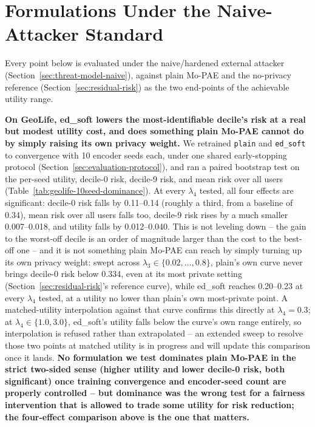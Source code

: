 \section{Formulations Under the Naive-Attacker Standard}
\label{sec:phase4}

Every point below is evaluated under the naive/hardened external
attacker (Section~\ref{sec:threat-model-naive}), against plain Mo-PAE
and the no-privacy reference (Section~\ref{sec:residual-risk}) as the
two end-points of the achievable utility range.

\textbf{On GeoLife, ed\_soft lowers the most-identifiable decile's risk at a real but modest utility cost, and does something plain Mo-PAE cannot do by simply raising its own privacy weight.} We retrained \texttt{plain} and \texttt{ed\_soft} to convergence with 10 encoder seeds each, under one shared early-stopping protocol (Section~\ref{sec:evaluation-protocol}), and ran a paired bootstrap test on the per-seed utility, decile-0 risk, decile-9 risk, and mean risk over all users (Table~\ref{tab:geolife-10seed-dominance}). At every $\lambda_4$ tested, all four effects are significant: decile-0 risk falls by 0.11--0.14 (roughly a third, from a baseline of 0.34), mean risk over all users falls too, decile-9 risk rises by a much smaller 0.007--0.018, and utility falls by 0.012--0.040. This is not leveling down -- the gain to the worst-off decile is an order of magnitude larger than the cost to the best-off one -- and it is not something plain Mo-PAE can reach by simply turning up its own privacy weight: swept across $\lambda_3 \in \{0.02,\ldots,0.8\}$, plain's own curve never brings decile-0 risk below 0.334, even at its most private setting (Section~\ref{sec:residual-risk}'s reference curve), while ed\_soft reaches 0.20--0.23 at every $\lambda_4$ tested, at a utility no lower than plain's own most-private point. A matched-utility interpolation against that curve confirms this directly at $\lambda_4=0.3$; at $\lambda_4\in\{1.0,3.0\}$, ed\_soft's utility falls below the curve's own range entirely, so interpolation is refused rather than extrapolated -- an extended sweep to resolve those two points at matched utility is in progress and will update this comparison once it lands. \textbf{No formulation we test dominates plain Mo-PAE in the strict two-sided sense (higher utility and lower decile-0 risk, both significant) once training convergence and encoder-seed count are properly controlled -- but dominance was the wrong test for a fairness intervention that is allowed to trade some utility for risk reduction; the four-effect comparison above is the one that matters.}

